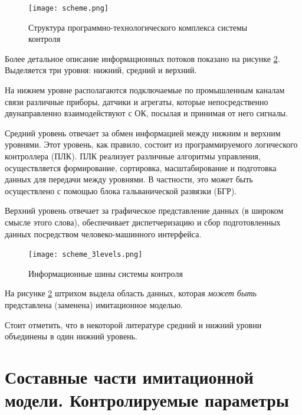 \begin{center}
    \begin{figure}[hb]
        \texttt{[image: scheme.png]}
        \caption{Структура программно-технологического комплекса системы контроля}\label{fig:asc_schema}
    \end{figure}
\end{center}

Более детальное описание информационных потоков показано на рисунке \ref{fig:asc_info_bus}.
Выделяется три уровня: нижний, средний и верхний.

На нижнем уровне располагаются подключаемые по промышленным каналам связи различные приборы, датчики и агрегаты,
которые непосредственно двунаправленно взаимодействуют с ОК, посылая и принимая от него сигналы.

Средний уровень отвечает за обмен информацией между нижним и верхним уровнями. Этот уровень, как правило,
состоит из программируемого логического контроллера (ПЛК). ПЛК реализует различные алгоритмы управления,
осуществляется формирование, сортировка, масштабирование и подготовка данных для передачи между уровнями.
В частности, это может быть осуществлено с помощью блока гальванической развязки (БГР).

Верхний уровень отвечает за графическое представление данных (в широком смысле этого слова),
обеспечивает диспетчеризацию и сбор подготовленных данных посредством человеко-машинного интерфейса.

\begin{center}
    \begin{figure}[hb]
        \texttt{[image: scheme\_3levels.png]}
        \caption{Информационные шины системы контроля}\label{fig:asc_info_bus}
    \end{figure}
\end{center}

На рисунке \ref{fig:asc_info_bus} штрихом выдела область данных, которая \textit{может быть}
представлена (заменена) имитационное моделью.

Стоит отметить, что в некоторой литературе средний и нижний уровни объединены в один нижний уровень.



\section{Составные части имитационной модели. Контролируемые параметры} \label{sec:submodels_asutp}

